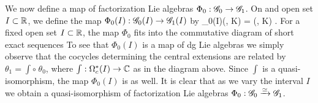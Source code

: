\documentclass[10pt]{amsart}
\begin{document}
We now define a map of factorization Lie algebras $\Phi_0 : \mathscr G_0 \to \mathscr G_1$. On and open set $I \subset \mathbb R$, we define the map $\Phi_0(I) : \mathscr G_0(I) \to \mathscr G_1(I)$ by
\ben
\Phi_0(I)(\varphi \alpha, \psi K) = \left(\varphi \alpha, \int \psi \cdot K\right) .
\een
For a fixed open set $I \subset \mathbb R$, the map $\Phi_0$ fits into the commutative diagram of short exact sequences
\ben
{}
\een
To see that $\Phi_0(I)$ is a map of dg Lie algebras we simply observe that the cocycles determining the central extensions are related by $\theta_1 = \int \circ \; \theta_0$, where $\int : \Omega^*_c(I) \to \mathbb C$ as in the diagram above. Since $\int$ is a quasi-isomorphism, the map $\Phi_0(I)$ is as well. It is clear that as we vary the interval $I$ we obtain a quasi-isomorphism of factorization Lie algebras $\Phi_0 : \mathscr G_0 \xrightarrow{\simeq} \mathscr G_1$. 

\end{document}
